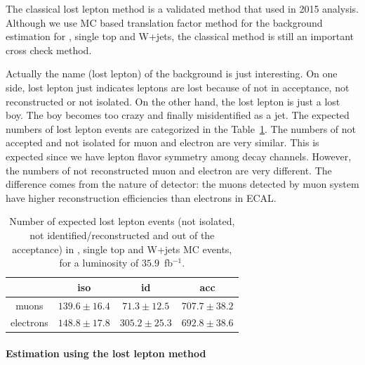 The classical lost lepton method is a validated method that used in 2015 analysis\cite{PhysRevD.96.012004}. Although we use MC based translation factor method for the background estimation for \ttbar, single top and W+jets, the classical method is still an important cross check method. 

Actually the name (lost lepton) of the background is just interesting. On one side, lost lepton just indicates leptons are lost because of not in acceptance, not reconstructed or not isolated. On the other hand, the lost lepton is just a lost boy. The boy becomes too crazy and finally misidentified as a jet. The expected numbers of lost lepton events are categorized in the Table~\ref{tab:nexpLL}. The numbers of not accepted and not isolated for muon and electron are very similar. This is expected since we have lepton flavor symmetry among \ttbar decay channels. However, the numbers of not reconstructed muon and electron are very different. The difference comes from the nature of detector: the muons detected by muon system have higher reconstruction efficiencies than electrons in ECAL. 

\begin{table}[htbp]
\fontsize{10 pt}{1.2 em}
\caption{Number of expected lost lepton events (not isolated, not identified/reconstructed and out of the acceptance) in \ttbar, single top and W+jets MC events, for a luminosity of $35.9$~fb$^{-1}$.} 
\begin{center}
\begin{tabular}{|c|c|c|c|}
\hline
          & iso  & id   & acc \\
\hline
muons     & $139.6\pm16.4$ & $71.3\pm12.5$ & $707.7\pm38.2$ \\
electrons & $148.8\pm17.8$ & $305.2\pm25.3$ & $692.8\pm38.6$ \\
\hline\end{tabular}
\end{center}
\label{tab:nexpLL}
\end{table}

\paragraph{Estimation using the lost lepton method}

